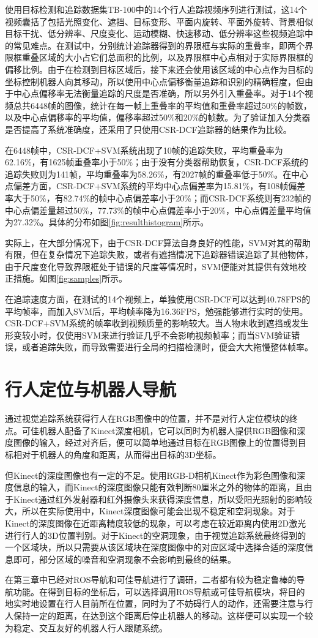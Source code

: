   使用目标检测和追踪数据集TB-100\cite{Wu2015Object}中的14个行人追踪视频序列进行测试，这14个视频囊括了包括光照变化、遮挡、目标变形、平面内旋转、平面外旋转、背景相似目标干扰、低分辨率、尺度变化、运动模糊、快速移动、低分辨率这些视频追踪中的常见难点。在测试中，分别统计追踪器得到的界限框与实际的重叠率，即两个界限框重叠区域的大小占它们总面积的比例，以及界限框中心点相对于实际界限框的偏移比例。由于在检测到目标区域后，接下来还会使用该区域的中心点作为目标的坐标控制机器人向其移动，所以使用中心点偏移衡量追踪和识别的精确程度，但由于中心点偏移率无法衡量追踪的尺度是否准确，所以另外引入重叠率。对于14个视频总共6448帧的图像，统计在每一帧上重叠率的平均值和重叠率超过50\%的帧数，以及中心点偏移率的平均值，偏移率超过50\%和20\%的帧数。为了验证加入分类器是否提高了系统准确度，还采用了只使用CSR-DCF追踪器的结果作为比较。

  在6448帧中，CSR-DCF+SVM系统出现了10帧的追踪失败，平均重叠率为62.16\%，有1625帧重叠率小于50\%；由于没有分类器帮助恢复，CSR-DCF系统的追踪失败则为141帧，平均重叠率为58.26\%，有2027帧的重叠率低于50\%。在中心点偏差方面，CSR-DCF+SVM系统的平均中心点偏差率为15.81\%，有108帧偏差率大于50\%，有82.74\%的帧中心点偏差率小于20\%；而CSR-DCF系统则有232帧的中心点偏差量超过50\%，77.73\%的帧中心点偏差率小于20\%，中心点偏差量平均值为27.32\%。具体的分布如图\ref{fig:resulthistogram}所示。


  实际上，在大部分情况下，由于CSR-DCF算法自身良好的性能，SVM对其的帮助有限，但在复杂情况下追踪失败，或者有遮挡情况下追踪器错误追踪了其他物体，由于尺度变化导致界限框处于错误的尺度等情况时，SVM便能对其提供有效地校正措施。如图\ref{fig:samples}所示。


  在追踪速度方面，在测试的14个视频上，单独使用CSR-DCF可以达到40.78FPS的平均帧率，而加入SVM后，平均帧率降为16.36FPS，勉强能够进行实时的使用。CSR-DCF+SVM系统的帧率收到视频质量的影响较大。当人物未收到遮挡或发生形变较小时，仅使用SVM来进行验证几乎不会影响视频帧率；而当SVM验证错误，或者追踪失败，而导致需要进行全局的扫描检测时，便会大大拖慢整体帧率。

\section{行人定位与机器人导航}

  通过视觉追踪系统获得行人在RGB图像中的位置，并不是对行人定位模块的终点。可佳机器人配备了Kinect深度相机，它可以同时为机器人提供RGB图像和深度图像的输入，经过对齐后，便可以简单地通过目标在RGB图像上的位置得到目标相对于机器人的角度和距离，从而得出目标的3D坐标。

  但Kinect的深度图像也有一定的不足。使用RGB-D相机Kinect作为彩色图像和深度信息的输入，而Kinect的深度图像只能有效判断80厘米之外的物体的距离，且由于Kinect通过红外发射器和红外摄像头来获得深度信息，所以受阳光照射的影响较大，所以在实际使用中，Kinect深度图像可能会出现不稳定和空洞现象。对于Kinect的深度图像在近距离精度较低的现象，可以考虑在较近距离内使用2D激光进行行人的3D位置判别。对于Kinect的空洞现象，由于视觉追踪系统最终得到的一个区域块，所以只需要从该区域块在深度图像中的对应区域中选择合适的深度信息即可，部分区域的噪音和空洞现象不会影响到最终的结果。

  在第三章中已经对ROS导航和可佳导航进行了调研，二者都有较为稳定鲁棒的导航功能。在得到目标的坐标后，可以选择调用ROS导航或可佳导航模块，将目的地实时地设置在行人目前所在位置，同时为了不妨碍行人的动作，还需要注意与行人保持一定的距离，在达到这个距离后停止机器人的移动。这样便可以实现一个较为稳定、交互友好的机器人行人跟随系统。
